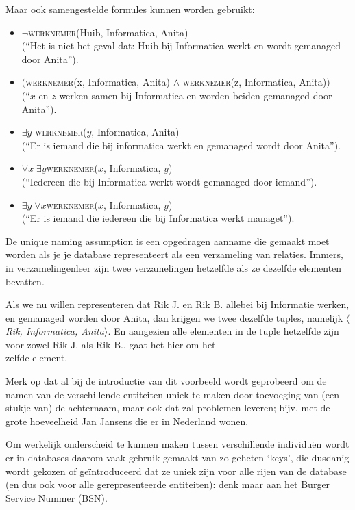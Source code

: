 Maar ook samengestelde formules kunnen worden gebruikt:
\begin{itemize}
\item $\neg$\textsc{werknemer}(Huib, Informatica, Anita)\\(``Het is niet het geval dat: Huib bij Informatica werkt en wordt gemanaged door Anita'').
\item $($\textsc{werknemer}(x, Informatica, Anita) $\wedge$ \textsc{werknemer}(z, Informatica, Anita)$)$\\(``$x$ en $z$ werken samen bij Informatica en worden beiden gemanaged door Anita'').
\item $\exists y$ \textsc{werknemer}($y$, Informatica, Anita)\\(``Er is iemand die bij informatica werkt en gemanaged wordt door Anita'').
\item $\forall x\;\exists y$\textsc{werknemer}($x$, Informatica, $y$)\\(``Iedereen die bij Informatica werkt wordt gemanaged door iemand'').
\item $\exists y\;\forall x$\textsc{werknemer}($x$, Informatica, $y$)\\(``Er is iemand die iedereen die bij Informatica werkt managet'').
\end{itemize}

\begin{aside}\mbox{}
De unique naming assumption is een opgedragen aanname die gemaakt moet worden als je je database representeert als een verzameling van relaties. Immers, in verzamelingenleer zijn twee verzamelingen hetzelfde als ze dezelfde elementen bevatten. 

Als we nu willen representeren dat Rik J. en Rik B. allebei bij Informatie werken, en gemanaged worden door Anita, dan krijgen we twee dezelfde tuples, namelijk \textit{$\langle$Rik, Informatica, Anita$\rangle$}. En aangezien alle elementen in de tuple hetzelfde zijn voor zowel Rik J. als Rik B., gaat het hier om het-\\[2.5pt]
zelfde element.

\hspace{20pt}Merk op dat al bij de introductie van dit voorbeeld wordt geprobeerd om de namen van de verschillende entiteiten uniek te maken door toevoeging van (een stukje van) de achternaam, maar ook dat zal problemen leveren; bijv. met de grote hoeveelheid Jan Jansens die er in Nederland wonen.

\hspace{20pt}Om werkelijk onderscheid te kunnen maken tussen verschillende individu\"en wordt er in databases daarom vaak gebruik gemaakt van zo geheten `keys', die dusdanig wordt gekozen of ge\"introduceerd dat ze uniek zijn voor alle rijen van de database (en dus ook voor alle gerepresenteerde entiteiten): denk maar aan het Burger Service Nummer (BSN).
\end{aside}

